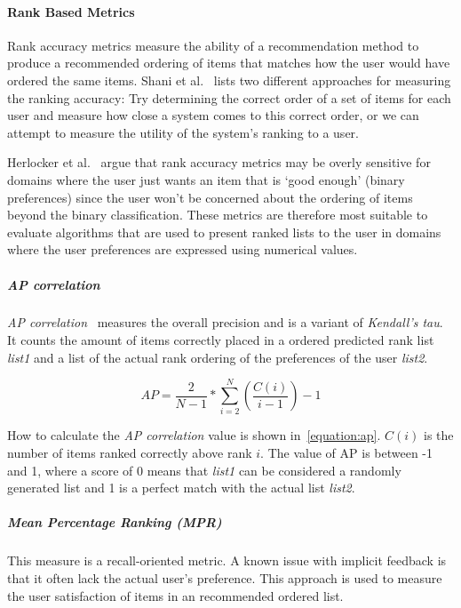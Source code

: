 \paragraph{Rank Based Metrics}
\label{para:rank_based}
Rank accuracy metrics measure the ability of a recommendation method to produce
a recommended ordering of items that matches how the user would have ordered
the same items. Shani et al.~\cite{Shani2011} lists two different approaches
for measuring the ranking accuracy: Try determining the correct order of a set
of items for each user and measure how close a system comes to this correct
order, or we can attempt to measure the utility of the system's ranking to a
user.

Herlocker et al.~\cite{Herlocker2004} argue that rank accuracy metrics may be
overly sensitive for domains where the user just wants an item that is `good
enough' (binary preferences) since the user won't be concerned about the
ordering of items beyond the binary classification. These metrics are therefore
most suitable to evaluate algorithms that are used to present ranked lists to
the user in domains where the user preferences are expressed using numerical
values.

\subparagraph{AP correlation}
\label{subp:ap_correlation}
\textit{AP correlation}~\cite{Yilmaz:2008:NRC:1390334.1390435} measures the
overall precision and is a variant of \textit{Kendall's tau}.  It counts the
amount of items correctly placed in a ordered predicted rank list
\textit{list1} and a list of the actual rank ordering of the preferences of the
user \textit{list2}.

\begin{equation}
	AP = \frac{2}{N - 1} * \sum_{i=2}^{N}{(\frac{C(i)}{i - 1})} - 1
	\label{equation:ap}
\end{equation}

How to calculate the \textit{AP correlation} value is shown in~\ref{equation:ap}.
$C(i)$ is the number of items ranked correctly above rank $i$.
The value of AP is between -1 and 1, where a score of 0 means that
\textit{list1} can be considered a randomly generated list and 1 is a perfect
match with the actual list \textit{list2}.

\label{par:accuracy_ranking}

\subparagraph{Mean Percentage Ranking (MPR)}
\label{subp:mean_percentage_ranking_}
This measure is a recall-oriented metric.  A known issue with implicit feedback
is that it often lack the actual user's preference.  This approach is used to
measure the user satisfaction of items in an recommended ordered list.

